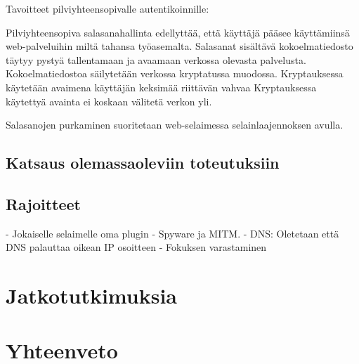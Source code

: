 \documentclass{tktltiki}
\begin{document}
Tavoitteet pilviyhteensopivalle autentikoinnille:

Pilviyhteensopiva salasanahallinta edellyttää, että käyttäjä pääsee käyttämiinsä web-palveluihin miltä tahansa työasemalta. 
Salasanat sisältävä kokoelmatiedosto täytyy pystyä tallentamaan ja avaamaan verkossa olevasta palvelusta. 
Kokoelmatiedostoa säilytetään verkossa kryptatussa muodossa. 
Kryptauksessa käytetään avaimena käyttäjän keksimää riittävän vahvaa 
Kryptauksessa käytettyä avainta ei koskaan välitetä verkon yli.


Salasanojen purkaminen suoritetaan web-selaimessa selainlaajennoksen avulla.



\subsection{Katsaus olemassaoleviin toteutuksiin}
\subsection{}
\subsection{Rajoitteet}
 - Jokaiselle selaimelle oma plugin
 - Spyware ja MITM. 
 - DNS: Oletetaan että DNS palauttaa oikean IP osoitteen
 - Fokuksen varastaminen
 
%   
%   
  
  
\section{Jatkotutkimuksia}
\section{Yhteenveto}





\lastpage
\end{document}
